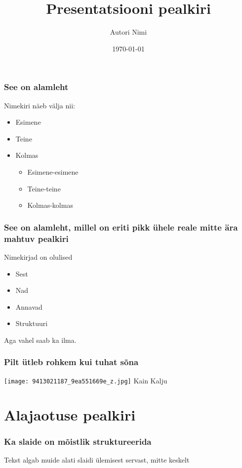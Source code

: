 \documentclass{beamer}
\title{Presentatsiooni pealkiri}
\date{\today}
\author{Autori Nimi}
\institute{Asutus ja tiitel}
\begin{document}
\begin{frame}
\titlepage
\end{frame}

\begin{frame}[t]
	\frametitle{See on alamleht}
	Nimekiri näeb välja nii:
	\begin{itemize}
		\item Esimene
		\item Teine
		\item Kolmas
		\begin{itemize}
			\item Esimene-esimene
			\item Teine-teine
			\item Kolmas-kolmas
		\end{itemize}
	\end{itemize}
\end{frame}

\begin{frame}[t]
	\frametitle{See on alamleht, millel on eriti pikk ühele reale mitte ära mahtuv pealkiri}
	Nimekirjad on olulised
	\begin{itemize}
		\item Sest
		\item Nad 
		\item Annavad 
		\item Struktuuri
	\end{itemize}
	Aga vahel saab ka ilma.
\end{frame}

\begin{frame}
	\frametitle{Pilt ütleb rohkem kui tuhat sõna}
	\texttt{[image: 9413021187\_9ea551669e\_z.jpg]}
	\vskip-1mm
	{\tiny Kain Kalju}
\end{frame}

\section{Alajaotuse pealkiri}

\begin{frame}[t]
	\frametitle{Ka slaide on mõistlik struktureerida}
	Tekst algab muide alati slaidi ülemisest servast, mitte keskelt
\end{frame}

\thnx
\end{document}
